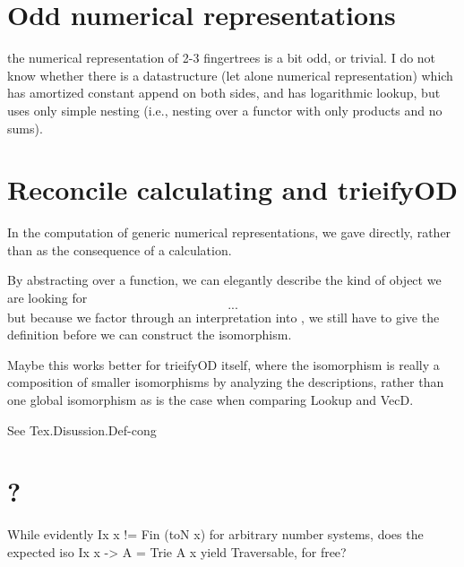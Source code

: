 \section{Odd numerical representations}
the numerical representation of 2-3 fingertrees is a bit odd, or trivial.
I do not know whether there is a datastructure (let alone numerical representation) which has amortized constant append on both sides, and has logarithmic lookup, but uses only simple nesting (i.e., nesting over a functor with only products and no sums).



\section{Reconcile calculating and trieifyOD}
\begin{outline}
In the computation of generic numerical representations, we gave  directly, rather than as the consequence of a calculation. %

By abstracting  over a function, we can elegantly describe the kind of object we are looking for
\[ ... \]
but because we factor through an interpretation into , we still have to give the definition before we can construct the isomorphism.

Maybe this works better for trieifyOD itself, where the isomorphism is really a composition of smaller isomorphisms by analyzing the descriptions, rather than one global isomorphism as is the case when comparing Lookup and VecD.

See Tex.Disussion.Def-cong
\end{outline}



\section{?}
While evidently Ix x != Fin (toN x) for arbitrary number systems, does the expected iso Ix x -> A = Trie A x yield Traversable, for free?





